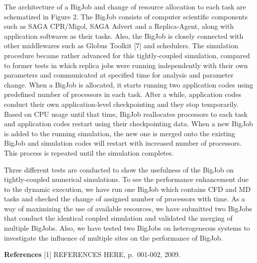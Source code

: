 \documentclass[a4paper]{article}
\begin{document}
The architecture of a BigJob and change of resource allocation to each task are schematized in Figure 2. The BigJob consists of computer scientific components such as SAGA CPR/Migol, SAGA Advert and a Replica-Agent, along with application softwares as their tasks. Also, the BigJob is closely connected with other middlewares such as Globus Toolkit [7] and schedulers. The simulation procedure became rather advanced for this tightly-coupled simulation, compared to former tests in which replica jobs were running independently with their own parameters and communicated at specified time for analysis and parameter change. When a BigJob is allocated, it starts running two application codes using predefined number of processors in each task. After a while, application codes conduct their own application-level checkpointing and they stop temporarily. Based on CPU usage until that time, BigJob reallocates processors to each task and application codes restart using their checkpointing data. When a new BigJob is added to the running simulation, the new one is merged onto the existing BigJob and simulation codes will restart with increased number of processors. This process is repeated until the simulation completes.

Three different tests are conducted to show the usefulness of the BigJob on tightly-coupled numerical simulations. To see the performance enhancement due to the dynamic execution, we have run one BigJob which contains CFD and MD tasks and checked the change of assigned number of processors with time. As a way of maximizing the use of available resources, we have submitted two BigJobs that conduct the identical coupled simulation and validated the merging of multiple BigJobs. Also, we have tested two BigJobs on heterogeneous systems to investigate the influence of multiple sites on the performance of BigJob.

\vspace{12pt}

\parindent=0pt
{\bf References}
[1] REFERENCES HERE, p.~001-002, 2009.

\vspace{12pt}
\end{document}
